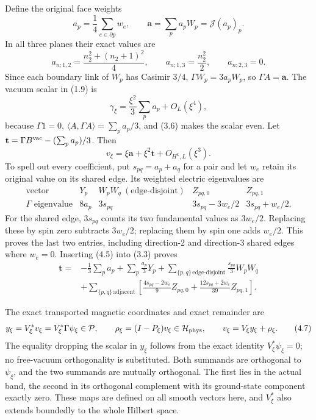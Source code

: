 \documentclass[
  11pt,
]{article}
\begin{document}
Define the original face weights \[
 a_p=\frac14\sum_{e\in\partial p}w_e,
 \qquad \mathbf a=\sum_pa_pW_p=\mathcal J(a_p)_p.
\tag{4.1}
\] In all three planes their exact values are \[
 a_{n;1,2}=\frac{n_2^2+(n_2+1)^2}{4},\qquad
 a_{n;1,3}=\frac{n_2^2}{2},\qquad a_{n;2,3}=0.
\tag{4.2}
\] Since each boundary link of \(W_p\) has Casimir \(3/4\),
\(\Gamma W_p=3a_pW_p\), so \(\Gamma A=\mathbf a\). The vacuum scalar in
(1.9) is \[
 \gamma_\xi=\frac{\xi^2}{3}\sum_pa_p+O_L(\xi^4),
\tag{4.3}
\] because \(\Gamma1=0\), \(\langle A,\Gamma A\rangle=\sum_pa_p/3\), and
(3.6) makes the scalar even. Let
\(\mathbf t=\Gamma B^{\rm vac}-(\sum_pa_p)/3\). Then \[
 v_\xi=\xi\mathbf a+\xi^2\mathbf t+O_{H^k,L}(\xi^3).
\tag{4.4}
\] To spell out every coefficient, put \(s_{pq}=a_p+a_q\) for a pair and
let \(w_e\) retain its original value on its shared edge. Its weighted
electric eigenvalues are \[
\begin{array}{c|cccc}
 \text{vector}&Y_p&W_pW_q\ (\text{edge-disjoint})&Z_{pq,0}&Z_{pq,1}\\\hline
 \Gamma\text{ eigenvalue}&8a_p&3s_{pq}&3s_{pq}-3w_e/2&3s_{pq}+w_e/2.
\end{array}
\tag{4.5}
\] For the shared edge, \(3s_{pq}\) counts its two fundamental values as
\(3w_e/2\). Replacing these by spin zero subtracts \(3w_e/2\); replacing
them by spin one adds \(w_e/2\). This proves the last two entries,
including direction-2 and direction-3 shared edges where \(w_e=0\).
Inserting (4.5) into (3.3) proves \[
\begin{split}
 \mathbf t={}&-\frac13\sum_pa_p+\sum_p\frac{a_p}{3}Y_p
 +\sum_{\{p,q\}\,\text{edge-disjoint}}\frac{s_{pq}}3 W_pW_q\\
 &+\sum_{\{p,q\}\,\text{adjacent}}
 \left[\frac{4s_{pq}-2w_e}{9}Z_{pq,0}
       +\frac{12s_{pq}+2w_e}{39}Z_{pq,1}\right].
\end{split}
\tag{4.6}
\]

The exact transported magnetic coordinates and exact remainder are \[
 y_\xi=V_\xi^*v_\xi=V_\xi^*\Gamma\psi_\xi\in\mathcal P,
 \qquad \rho_\xi=(I-P_\xi)v_\xi\in\mathcal H_{\rm phys},
 \qquad v_\xi=V_\xi y_\xi+\rho_\xi.
\tag{4.7}
\] The equality dropping the scalar in \(y_\xi\) follows from the exact
identity \(V_\xi^*\psi_\xi=0\); no free-vacuum orthogonality is
substituted. Both summands are orthogonal to \(\psi_\xi\), and the two
summands are mutually orthogonal. The first lies in the actual band, the
second in its orthogonal complement with its ground-state component
exactly zero. These maps are defined on all smooth vectors here, and
\(V_\xi^*\) also extends boundedly to the whole Hilbert space.
\end{document}
